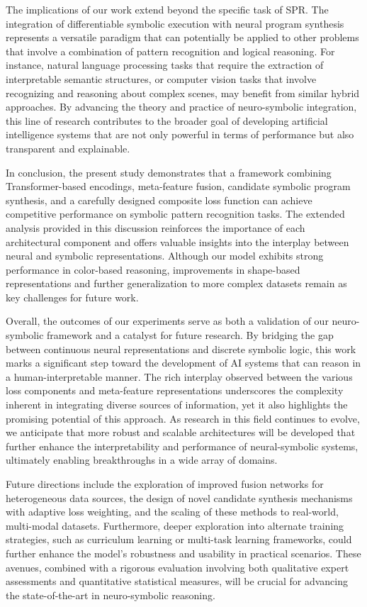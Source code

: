 \documentclass[11pt]{article}
\begin{document}
The implications of our work extend beyond the specific task of SPR. The integration of differentiable symbolic execution with neural program synthesis represents a versatile paradigm that can potentially be applied to other problems that involve a combination of pattern recognition and logical reasoning. For instance, natural language processing tasks that require the extraction of interpretable semantic structures, or computer vision tasks that involve recognizing and reasoning about complex scenes, may benefit from similar hybrid approaches. By advancing the theory and practice of neuro-symbolic integration, this line of research contributes to the broader goal of developing artificial intelligence systems that are not only powerful in terms of performance but also transparent and explainable.

In conclusion, the present study demonstrates that a framework combining Transformer-based encodings, meta-feature fusion, candidate symbolic program synthesis, and a carefully designed composite loss function can achieve competitive performance on symbolic pattern recognition tasks. The extended analysis provided in this discussion reinforces the importance of each architectural component and offers valuable insights into the interplay between neural and symbolic representations. Although our model exhibits strong performance in color-based reasoning, improvements in shape-based representations and further generalization to more complex datasets remain as key challenges for future work.

Overall, the outcomes of our experiments serve as both a validation of our neuro-symbolic framework and a catalyst for future research. By bridging the gap between continuous neural representations and discrete symbolic logic, this work marks a significant step toward the development of AI systems that can reason in a human-interpretable manner. The rich interplay observed between the various loss components and meta-feature representations underscores the complexity inherent in integrating diverse sources of information, yet it also highlights the promising potential of this approach. As research in this field continues to evolve, we anticipate that more robust and scalable architectures will be developed that further enhance the interpretability and performance of neural-symbolic systems, ultimately enabling breakthroughs in a wide array of domains.

Future directions include the exploration of improved fusion networks for heterogeneous data sources, the design of novel candidate synthesis mechanisms with adaptive loss weighting, and the scaling of these methods to real-world, multi-modal datasets. Furthermore, deeper exploration into alternate training strategies, such as curriculum learning or multi-task learning frameworks, could further enhance the model’s robustness and usability in practical scenarios. These avenues, combined with a rigorous evaluation involving both qualitative expert assessments and quantitative statistical measures, will be crucial for advancing the state-of-the-art in neuro-symbolic reasoning.
\end{document}
